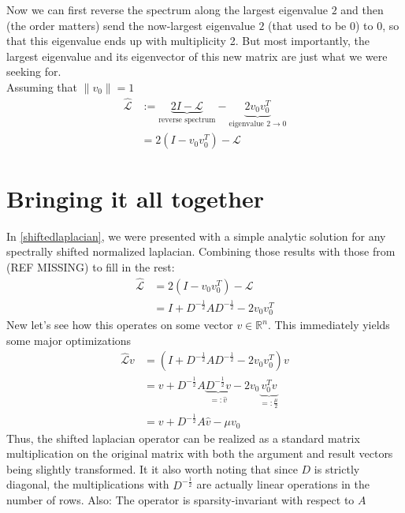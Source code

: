 \documentclass[10pt, a4paper, twocolumn]{article} %
\begin{document}
Now we can first reverse the spectrum along the largest eigenvalue $2$ and then (the order matters) send the
now-largest eigenvalue $2$ (that used to be $0$) to $0$, so that this eigenvalue ends up with multiplicity 2.
But most importantly, the largest eigenvalue and its eigenvector of this new matrix are just what we were seeking for.
\\
Assuming that $\lVert v_0 \lVert = 1$
\begin{equation}\label{shiftedlaplacian}
	\begin{split}
		\hat{\mathcal{L}} & := \underbrace{2I - \mathcal{L}}_{\text{reverse spectrum}} - \underbrace{2 v_0 v_0^T}_{\text{eigenvalue $2 \rightarrow 0$}}\\
		& = 2 ( I - v_0 v_0^T ) - \mathcal{L}
	\end{split}
\end{equation}

\section{Bringing it all together}
In \eqref{shiftedlaplacian}, we were presented with a simple analytic solution for any spectrally shifted normalized laplacian.
Combining those results with those from (REF MISSING) to fill in the rest:
\begin{equation}
	\begin{split}
		\hat{\mathcal{L}} & = 2 ( I - v_0 v_0^T ) - \mathcal{L}\\
		& = I + D^{-\frac{1}{2}} A D^{-\frac{1}{2}} - 2 v_0 v_0^T
	\end{split}
\end{equation}
New let's see how this operates on some vector $v \in \mathbb{R}^n$. This immediately yields some major optimizations
\begin{equation}
	\begin{split}
		\hat{\mathcal{L}}v & = \left( I + D^{-\frac{1}{2}} A D^{-\frac{1}{2}} - 2 v_0 v_0^T\right) v\\
		& = v + D^{-\frac{1}{2}} A \underbrace{D^{-\frac{1}{2}} v}_{=:\hat{v}} - 2 v_0 \underbrace{v_0^T v}_{=:\frac{\mu}{2}}\\
		& = v + D^{-\frac{1}{2}} A \hat{v} - \mu v_0
	\end{split}
\end{equation}
Thus, the shifted laplacian operator can be realized as a standard matrix multiplication on the original matrix with both the
argument and result vectors being slightly transformed. It it also worth noting that since $D$ is strictly diagonal, the multiplications with $D^{-\frac{1}{2}}$
are actually linear operations in the number of rows. Also: The operator is sparsity-invariant with respect to $A$
\end{document}

